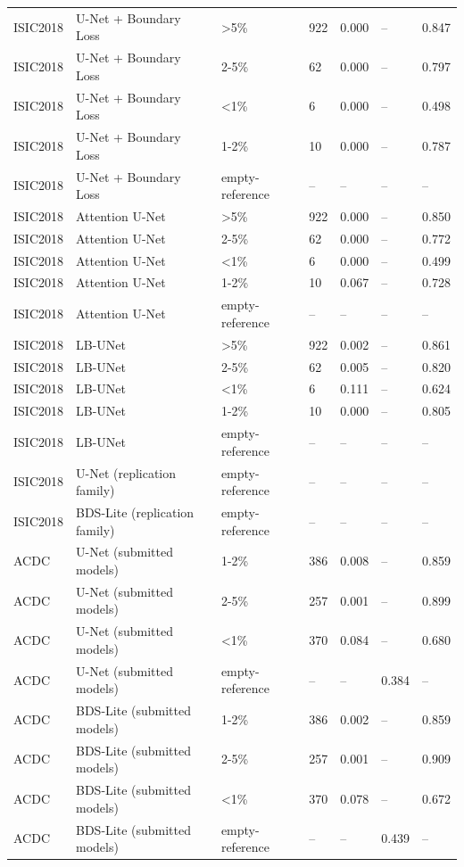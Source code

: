 \begin{tabular}{lllllll}
ISIC2018 & U-Net + Boundary Loss & >5\% & 922 & 0.000 & -- & 0.847 \\
ISIC2018 & U-Net + Boundary Loss & 2-5\% & 62 & 0.000 & -- & 0.797 \\
ISIC2018 & U-Net + Boundary Loss & <1\% & 6 & 0.000 & -- & 0.498 \\
ISIC2018 & U-Net + Boundary Loss & 1-2\% & 10 & 0.000 & -- & 0.787 \\
ISIC2018 & U-Net + Boundary Loss & empty-reference & -- & -- & -- & -- \\
ISIC2018 & Attention U-Net & >5\% & 922 & 0.000 & -- & 0.850 \\
ISIC2018 & Attention U-Net & 2-5\% & 62 & 0.000 & -- & 0.772 \\
ISIC2018 & Attention U-Net & <1\% & 6 & 0.000 & -- & 0.499 \\
ISIC2018 & Attention U-Net & 1-2\% & 10 & 0.067 & -- & 0.728 \\
ISIC2018 & Attention U-Net & empty-reference & -- & -- & -- & -- \\
ISIC2018 & LB-UNet & >5\% & 922 & 0.002 & -- & 0.861 \\
ISIC2018 & LB-UNet & 2-5\% & 62 & 0.005 & -- & 0.820 \\
ISIC2018 & LB-UNet & <1\% & 6 & 0.111 & -- & 0.624 \\
ISIC2018 & LB-UNet & 1-2\% & 10 & 0.000 & -- & 0.805 \\
ISIC2018 & LB-UNet & empty-reference & -- & -- & -- & -- \\
ISIC2018 & U-Net (replication family) & empty-reference & -- & -- & -- & -- \\
ISIC2018 & BDS-Lite (replication family) & empty-reference & -- & -- & -- & -- \\
ACDC & U-Net (submitted models) & 1-2\% & 386 & 0.008 & -- & 0.859 \\
ACDC & U-Net (submitted models) & 2-5\% & 257 & 0.001 & -- & 0.899 \\
ACDC & U-Net (submitted models) & <1\% & 370 & 0.084 & -- & 0.680 \\
ACDC & U-Net (submitted models) & empty-reference & -- & -- & 0.384 & -- \\
ACDC & BDS-Lite (submitted models) & 1-2\% & 386 & 0.002 & -- & 0.859 \\
ACDC & BDS-Lite (submitted models) & 2-5\% & 257 & 0.001 & -- & 0.909 \\
ACDC & BDS-Lite (submitted models) & <1\% & 370 & 0.078 & -- & 0.672 \\
ACDC & BDS-Lite (submitted models) & empty-reference & -- & -- & 0.439 & -- \\

\end{tabular}
